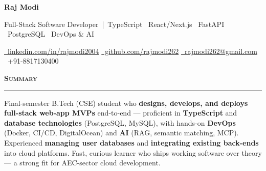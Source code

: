 \documentclass[a4paper,10pt]{article}
\newcommand{\sectionHeader}[2]{%
  \vspace{1.5pt}%
  \noindent%
  {\normalsize\bfseries\color{HeaderDark}#2\enspace\textsc{#1}}%
  \\[-6pt]%
  {\color{SectionLine}\rule{\textwidth}{1pt}}%
  \vspace{1pt}\par%
}
\begin{document}

\begin{center}
  {\fontsize{24}{28}\selectfont\bfseries\color{HeaderDark}Raj Modi}

  \vspace{2pt}

  {\small\color{MidGray}Full-Stack Software Developer \,|\, TypeScript \textperiodcentered\ React/Next.js \textperiodcentered\ FastAPI \textperiodcentered\ PostgreSQL \textperiodcentered\ DevOps \& AI}

  \vspace{3pt}

  {\small%
    \href{https://www.linkedin.com/in/rajmodi2004/}{{\color{AccentBlue}\faLinkedin}~\color{LinkBlue}linkedin.com/in/rajmodi2004}%
    \quad{\color{LightGray}|}%
    \quad\href{https://github.com/rajmodi262}{{\color{AccentBlue}\faGithub}~\color{LinkBlue}github.com/rajmodi262}%
    \quad{\color{LightGray}|}%
    \quad\href{mailto:rajmodi262@gmail.com}{{\color{AccentBlue}\faEnvelope}~\color{LinkBlue}rajmodi262@gmail.com}%
    \quad{\color{LightGray}|}%
    \quad{\color{AccentBlue}\faPhone*}~{\color{DarkGray}+91-8817130400}%
  }
\end{center}

\vspace{-2pt}


\sectionHeader{Summary}{\faUser}

\vspace{1pt}
{\small Final-semester B.Tech (CSE) student who \textbf{designs, develops, and deploys full-stack web-app MVPs} end-to-end --- proficient in \textbf{TypeScript} and \textbf{database technologies} (PostgreSQL, MySQL), with hands-on \textbf{DevOps} (Docker, CI/CD, DigitalOcean) and \textbf{AI} (RAG, semantic matching, MCP). Experienced \textbf{managing user databases} and \textbf{integrating existing back-ends} into cloud platforms. Fast, curious learner who ships working software over theory --- a strong fit for AEC-sector cloud development.}

\end{document}
